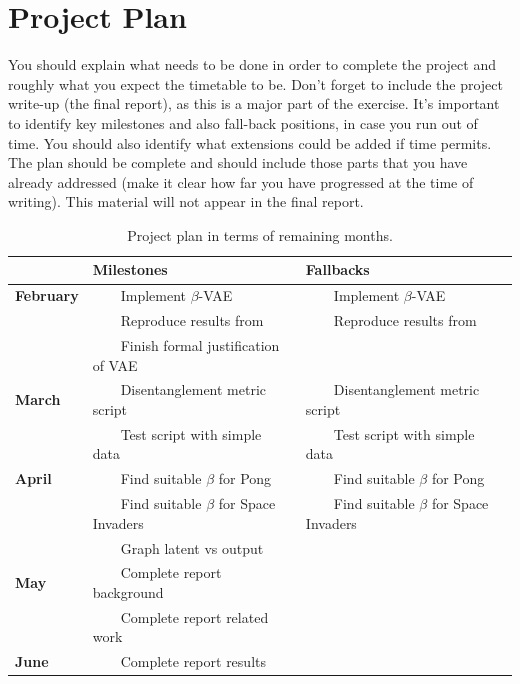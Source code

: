 \documentclass[12pt,twoside]{article}
\begin{document}
\section{Project Plan}
You should explain what needs to be done in order to complete the project and roughly what you expect the timetable to be. Don’t forget to include the project write-up (the final report), as this is a major part of the exercise. It’s important to identify key milestones and also fall-back positions, in case you run out of time.  You should also identify what extensions could be added if time permits.  The plan should be complete and should include those parts that you have already addressed (make it clear how far you have progressed at the time of writing).  This material will not appear in the final report.

\newcommand{\tabitem}{~~\llap{\textbullet}~~}
\begin{table}[h!]
\centering
\caption{Project plan in terms of remaining months.}
\label{tab:project_plan}
\begin{tabular}{@{}lll@{}}
\toprule
                  & \textbf{Milestones}                 & \textbf{Fallbacks}             \\ \midrule
\textbf{February} & \tabitem Implement $\beta$-VAE      & \tabitem Implement $\beta$-VAE \\
                  & \tabitem Reproduce results from \cite{Higgins2016} & \tabitem Reproduce results from \cite{Higgins2016}\\
                  & \tabitem Finish formal justification of VAE &  \\
\textbf{March}    & \tabitem Disentanglement metric script & \tabitem Disentanglement metric script \\
                  & \tabitem Test script with simple data & \tabitem Test script with simple data   \\
\textbf{April}    & \tabitem Find suitable $\beta$ for Pong & \tabitem Find suitable $\beta$ for Pong \\
                  & \tabitem Find suitable $\beta$ for Space Invaders & \tabitem Find suitable $\beta$ for Space Invaders \\
                  & \tabitem Graph latent vs output &                    \\                  
\textbf{May}      & \tabitem Complete report background & \\
                  & \tabitem Complete report related work &                    \\                  
\textbf{June}     & \tabitem Complete report results      &                    \\ \bottomrule
\end{tabular}
\end{table}
\end{document}
